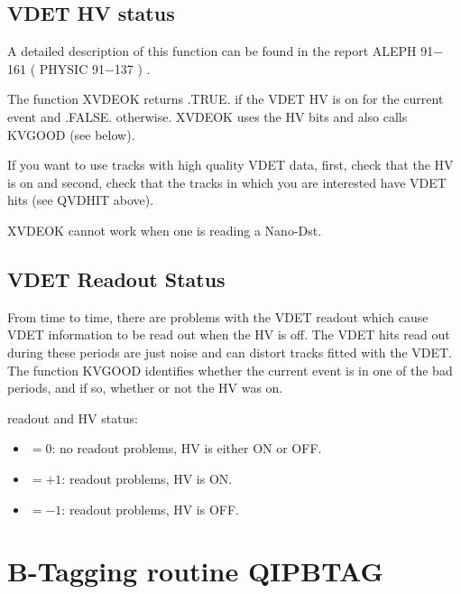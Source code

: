 \subsection{\label{sec-XVDEOK}VDET HV status}
\par
{}
\par
A detailed description of this function can be found in the report ALEPH 91$-$161 ( PHYSIC 91$-$137 ) .
 
The function XVDEOK
returns .TRUE. if the VDET HV is on for the current event and .FALSE. otherwise.
XVDEOK uses the HV bits and also calls KVGOOD (see below).
\par
If you want to use tracks with high quality VDET data,
first, check that the HV is on and second, check that the tracks in which
you are interested have VDET hits (see QVDHIT above).
\par
 XVDEOK cannot work when one is reading a Nano-Dst.
\par
\subsection{\label{sec-KVGOOD}VDET Readout Status}
\par
\noindent{}
\par
\par
From time to time, there are problems with the VDET
readout which cause VDET information to be read out when the HV is off.
The VDET hits read out during these periods are just noise and can
distort tracks fitted with the VDET.
The function KVGOOD
identifies whether the current event is in one of the bad periods, and if so,
whether or not the HV was on.
\par
\begin{indentlist}{ 3.50cm}{ 3.75cm}
readout and HV status:
\begin{itemize}
\item $= 0$:  no readout problems, HV is either ON or OFF.
\item $=+1$:  readout problems, HV is ON.
\item $=-1$:  readout problems, HV is OFF.
\end{itemize}
\end{indentlist}
\par
\section{\label{sec-OARQIPB}B-Tagging routine  QIPBTAG}
\par
